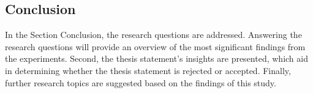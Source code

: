 \subsection{Conclusion}
In the Section Conclusion, the research questions are addressed. Answering the research questions will provide an overview of the most significant findings from the experiments. Second, the thesis statement's insights are presented, which aid in determining whether the thesis statement is rejected or accepted. Finally, further research topics are suggested based on the findings of this study. 


